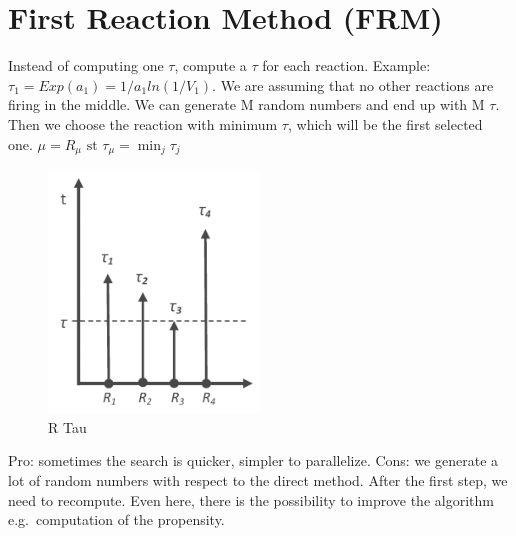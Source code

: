 \section{First Reaction Method (FRM)}
Instead of computing one $\tau$, compute a $\tau$ for each reaction.
Example: $\tau_1 = Exp(a_1)=1/a_1ln(1/V_1)$.
We are assuming that no other reactions are firing in the middle.
We can generate M random numbers and end up with M $\tau$.
Then we choose the reaction with minimum $\tau$, which will be the first selected one.
$\mu= R_{\mu}\text{ st }\tau_{\mu}= \min_{j}\tau_j$

 \begin{figure}
    \centering
    \includegraphics[width=0.5\textwidth]{R_tau.png}
    \caption{R Tau}
  \end{figure}

Pro: sometimes the search is quicker, simpler to parallelize. Cons: we generate a lot of random numbers with respect to the direct method.
After the first step, we need to recompute.
Even here, there is the possibility to improve the algorithm e.g.~computation of the propensity.


